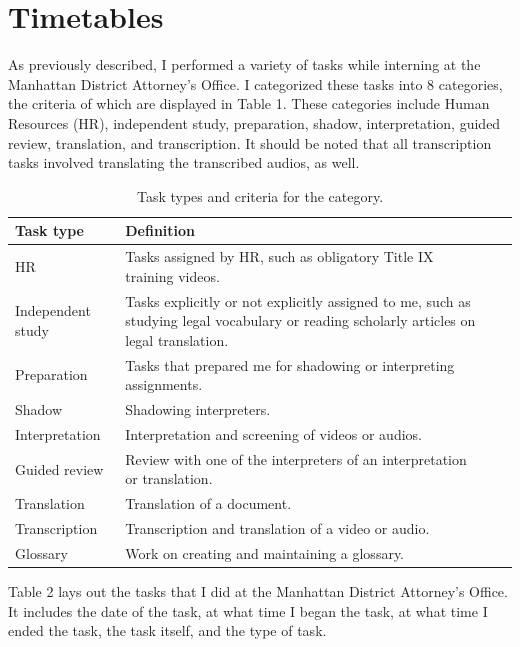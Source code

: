\documentclass{article}
\begin{document}
\section{Timetables}

As previously described, I performed a variety of tasks while interning at the Manhattan District Attorney’s Office. I categorized these tasks into 8 categories, the criteria of which are displayed in Table 1. These categories include Human Resources (HR), independent study, preparation, shadow, interpretation, guided review, translation, and transcription. It should be noted that all transcription tasks involved translating the transcribed audios, as well.

\begin{table}[H]
\centering
\caption{Task types and criteria for the category.} 
\label{tab:task_types}
\begin{tabular}{lp{10cm} lp{5cm}}
\toprule
Task type & Definition\\
\midrule
\addlinespace
HR & Tasks assigned by HR, such as obligatory Title IX training videos.\\
\addlinespace
Independent study & Tasks explicitly or not explicitly assigned to me, such as studying legal vocabulary or reading scholarly articles on legal translation.\\
\addlinespace
Preparation & Tasks that prepared me for shadowing or interpreting assignments.\\
\addlinespace
Shadow & Shadowing interpreters.\\
\addlinespace
Interpretation & Interpretation and screening of videos or audios.\\
\addlinespace
Guided review & Review with one of the interpreters of an interpretation or translation.\\
\addlinespace
Translation & Translation of a document.\\
\addlinespace
Transcription & Transcription and translation of a video or audio.\\
\addlinespace
Glossary & Work on creating and maintaining a glossary.\\
\bottomrule
\end{tabular}
\end{table}

Table 2 lays out the tasks that I did at the Manhattan District Attorney’s Office. It includes the date of the task, at what time I began the task, at what time I ended the task, the task itself, and the type of task.
\end{document}
